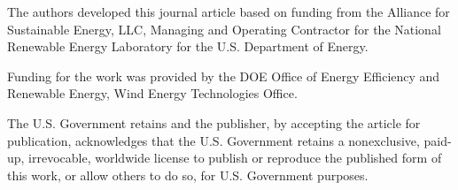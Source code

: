 \documentclass[WESD, manuscript]{copernicus}
\begin{document}









\begin{acknowledgements}
The authors developed this journal article based on funding from the Alliance for Sustainable Energy, LLC, Managing and Operating Contractor for the National Renewable Energy Laboratory for the U.S. Department of Energy. 

Funding for the work was provided by the DOE Office of Energy Efficiency and Renewable Energy, Wind Energy Technologies Office.

The U.S. Government retains and the publisher, by accepting the article for publication, acknowledges that the U.S. Government retains a nonexclusive, paid-up, irrevocable, worldwide license to publish or reproduce the published form of this work, or allow others to do so, for U.S. Government purposes.
\end{acknowledgements}





\end{document}
